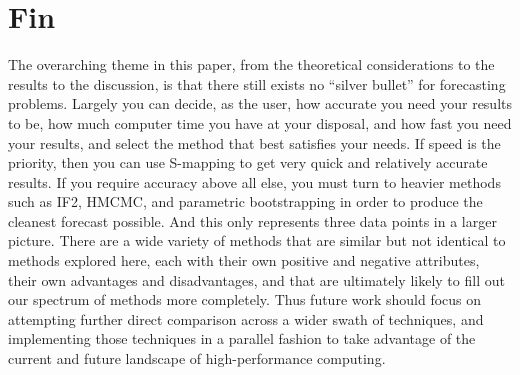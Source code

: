 \section{Fin}

	The overarching theme in this paper, from the theoretical considerations to the results to the discussion, is that there still exists no ``silver bullet'' for forecasting problems. Largely you can decide, as the user, how accurate you need your results to be, how much computer time you have at your disposal, and how fast you need your results, and select the method that best satisfies your needs. If speed is the priority, then you can use S-mapping to get very quick and relatively accurate results. If you require accuracy above all else, you must turn to heavier methods such as IF2, HMCMC, and parametric bootstrapping in order to produce the cleanest forecast possible. And this only represents three data points in a larger picture. There are a wide variety of methods that are similar but not identical to methods explored here, each with their own positive and negative attributes, their own advantages and disadvantages, and that are ultimately likely to fill out our spectrum of methods more completely. Thus future work should focus on attempting further direct comparison across a wider swath of techniques, and implementing those techniques in a parallel fashion to take advantage of the current and future landscape of high-performance computing.